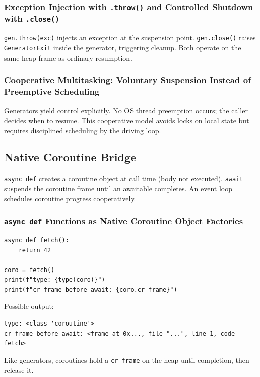 \documentclass[a4paper,twoside]{report}
\begin{document}
\subsubsection{Exception Injection with \texttt{.throw()} and Controlled Shutdown with \texttt{.close()}}

\texttt{gen.throw(exc)} injects an exception at the suspension point. \texttt{gen.close()} raises \texttt{GeneratorExit} inside the generator, triggering cleanup. Both operate on the same heap frame as ordinary resumption.

\subsubsection{Cooperative Multitasking: Voluntary Suspension Instead of Preemptive Scheduling}

Generators yield control explicitly. No OS thread preemption occurs; the caller decides when to resume. This cooperative model avoids locks on local state but requires disciplined scheduling by the driving loop.


\subsection{Native Coroutine Bridge}

\texttt{async def} creates a coroutine object at call time (body not executed). \texttt{await} suspends the coroutine frame until an awaitable completes. An event loop schedules coroutine progress cooperatively.

\subsubsection{\texttt{async def} Functions as Native Coroutine Object Factories}

\begin{verbatim}
async def fetch():
    return 42

coro = fetch()
print(f"type: {type(coro)}")
print(f"cr_frame before await: {coro.cr_frame}")
\end{verbatim}

Possible output:

\begin{verbatim}
type: <class 'coroutine'>
cr_frame before await: <frame at 0x..., file "...", line 1, code fetch>
\end{verbatim}

Like generators, coroutines hold a \texttt{cr\_frame} on the heap until completion, then release it.
\end{document}
